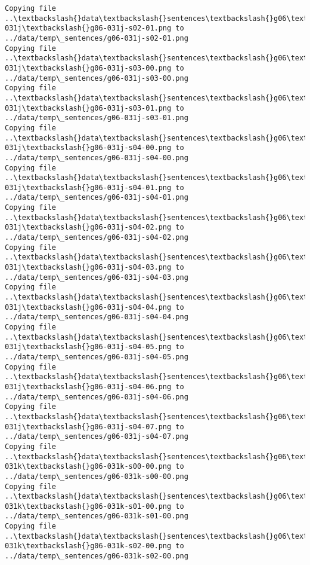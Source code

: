 \documentclass[11pt]{article}
\begin{document}
\begin{Verbatim}[commandchars=\\\{\}]
Copying file ..\textbackslash{}data\textbackslash{}sentences\textbackslash{}g06\textbackslash{}g06-031j\textbackslash{}g06-031j-s02-01.png to
../data/temp\_sentences/g06-031j-s02-01.png
Copying file ..\textbackslash{}data\textbackslash{}sentences\textbackslash{}g06\textbackslash{}g06-031j\textbackslash{}g06-031j-s03-00.png to
../data/temp\_sentences/g06-031j-s03-00.png
Copying file ..\textbackslash{}data\textbackslash{}sentences\textbackslash{}g06\textbackslash{}g06-031j\textbackslash{}g06-031j-s03-01.png to
../data/temp\_sentences/g06-031j-s03-01.png
Copying file ..\textbackslash{}data\textbackslash{}sentences\textbackslash{}g06\textbackslash{}g06-031j\textbackslash{}g06-031j-s04-00.png to
../data/temp\_sentences/g06-031j-s04-00.png
Copying file ..\textbackslash{}data\textbackslash{}sentences\textbackslash{}g06\textbackslash{}g06-031j\textbackslash{}g06-031j-s04-01.png to
../data/temp\_sentences/g06-031j-s04-01.png
Copying file ..\textbackslash{}data\textbackslash{}sentences\textbackslash{}g06\textbackslash{}g06-031j\textbackslash{}g06-031j-s04-02.png to
../data/temp\_sentences/g06-031j-s04-02.png
Copying file ..\textbackslash{}data\textbackslash{}sentences\textbackslash{}g06\textbackslash{}g06-031j\textbackslash{}g06-031j-s04-03.png to
../data/temp\_sentences/g06-031j-s04-03.png
Copying file ..\textbackslash{}data\textbackslash{}sentences\textbackslash{}g06\textbackslash{}g06-031j\textbackslash{}g06-031j-s04-04.png to
../data/temp\_sentences/g06-031j-s04-04.png
Copying file ..\textbackslash{}data\textbackslash{}sentences\textbackslash{}g06\textbackslash{}g06-031j\textbackslash{}g06-031j-s04-05.png to
../data/temp\_sentences/g06-031j-s04-05.png
Copying file ..\textbackslash{}data\textbackslash{}sentences\textbackslash{}g06\textbackslash{}g06-031j\textbackslash{}g06-031j-s04-06.png to
../data/temp\_sentences/g06-031j-s04-06.png
Copying file ..\textbackslash{}data\textbackslash{}sentences\textbackslash{}g06\textbackslash{}g06-031j\textbackslash{}g06-031j-s04-07.png to
../data/temp\_sentences/g06-031j-s04-07.png
Copying file ..\textbackslash{}data\textbackslash{}sentences\textbackslash{}g06\textbackslash{}g06-031k\textbackslash{}g06-031k-s00-00.png to
../data/temp\_sentences/g06-031k-s00-00.png
Copying file ..\textbackslash{}data\textbackslash{}sentences\textbackslash{}g06\textbackslash{}g06-031k\textbackslash{}g06-031k-s01-00.png to
../data/temp\_sentences/g06-031k-s01-00.png
Copying file ..\textbackslash{}data\textbackslash{}sentences\textbackslash{}g06\textbackslash{}g06-031k\textbackslash{}g06-031k-s02-00.png to
../data/temp\_sentences/g06-031k-s02-00.png

\end{Verbatim}
\end{document}
